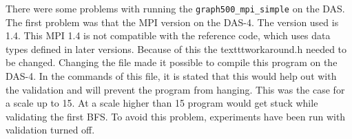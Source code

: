 There were some problems with running the \texttt{graph500\_mpi\_simple} on the DAS. The first problem was that the MPI version on the DAS-4. The version used is 1.4. This MPI 1.4 is not compatible with the reference code, which uses data types defined in later versions. Because of this the texttt{workaround.h} needed to be changed. Changing the file made it possible to compile this program on the DAS-4. In the commands of this file, it is stated that this would help out with the validation and will prevent the program from hanging. This was the case for a scale up to 15. At a scale higher than 15 program would get stuck while validating the first BFS. To avoid this problem, experiments have been run with validation turned off.